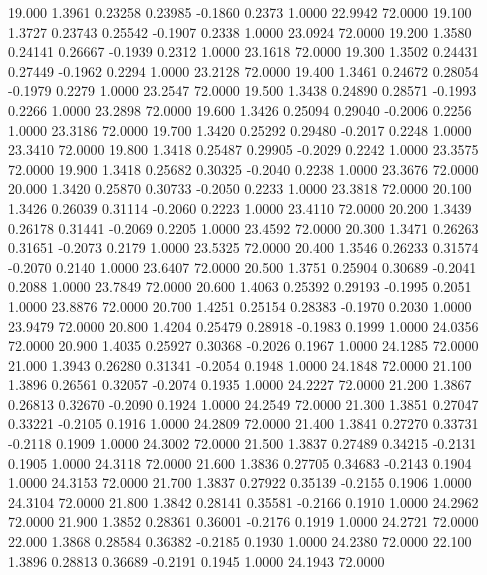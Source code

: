   19.000   1.3961   0.23258   0.23985  -0.1860   0.2373   1.0000  22.9942  72.0000
  19.100   1.3727   0.23743   0.25542  -0.1907   0.2338   1.0000  23.0924  72.0000
  19.200   1.3580   0.24141   0.26667  -0.1939   0.2312   1.0000  23.1618  72.0000
  19.300   1.3502   0.24431   0.27449  -0.1962   0.2294   1.0000  23.2128  72.0000
  19.400   1.3461   0.24672   0.28054  -0.1979   0.2279   1.0000  23.2547  72.0000
  19.500   1.3438   0.24890   0.28571  -0.1993   0.2266   1.0000  23.2898  72.0000
  19.600   1.3426   0.25094   0.29040  -0.2006   0.2256   1.0000  23.3186  72.0000
  19.700   1.3420   0.25292   0.29480  -0.2017   0.2248   1.0000  23.3410  72.0000
  19.800   1.3418   0.25487   0.29905  -0.2029   0.2242   1.0000  23.3575  72.0000
  19.900   1.3418   0.25682   0.30325  -0.2040   0.2238   1.0000  23.3676  72.0000
  20.000   1.3420   0.25870   0.30733  -0.2050   0.2233   1.0000  23.3818  72.0000
  20.100   1.3426   0.26039   0.31114  -0.2060   0.2223   1.0000  23.4110  72.0000
  20.200   1.3439   0.26178   0.31441  -0.2069   0.2205   1.0000  23.4592  72.0000
  20.300   1.3471   0.26263   0.31651  -0.2073   0.2179   1.0000  23.5325  72.0000
  20.400   1.3546   0.26233   0.31574  -0.2070   0.2140   1.0000  23.6407  72.0000
  20.500   1.3751   0.25904   0.30689  -0.2041   0.2088   1.0000  23.7849  72.0000
  20.600   1.4063   0.25392   0.29193  -0.1995   0.2051   1.0000  23.8876  72.0000
  20.700   1.4251   0.25154   0.28383  -0.1970   0.2030   1.0000  23.9479  72.0000
  20.800   1.4204   0.25479   0.28918  -0.1983   0.1999   1.0000  24.0356  72.0000
  20.900   1.4035   0.25927   0.30368  -0.2026   0.1967   1.0000  24.1285  72.0000
  21.000   1.3943   0.26280   0.31341  -0.2054   0.1948   1.0000  24.1848  72.0000
  21.100   1.3896   0.26561   0.32057  -0.2074   0.1935   1.0000  24.2227  72.0000
  21.200   1.3867   0.26813   0.32670  -0.2090   0.1924   1.0000  24.2549  72.0000
  21.300   1.3851   0.27047   0.33221  -0.2105   0.1916   1.0000  24.2809  72.0000
  21.400   1.3841   0.27270   0.33731  -0.2118   0.1909   1.0000  24.3002  72.0000
  21.500   1.3837   0.27489   0.34215  -0.2131   0.1905   1.0000  24.3118  72.0000
  21.600   1.3836   0.27705   0.34683  -0.2143   0.1904   1.0000  24.3153  72.0000
  21.700   1.3837   0.27922   0.35139  -0.2155   0.1906   1.0000  24.3104  72.0000
  21.800   1.3842   0.28141   0.35581  -0.2166   0.1910   1.0000  24.2962  72.0000
  21.900   1.3852   0.28361   0.36001  -0.2176   0.1919   1.0000  24.2721  72.0000
  22.000   1.3868   0.28584   0.36382  -0.2185   0.1930   1.0000  24.2380  72.0000
  22.100   1.3896   0.28813   0.36689  -0.2191   0.1945   1.0000  24.1943  72.0000
